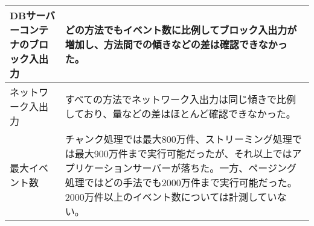 \documentclass[../../../main]{subfiles}
\begin{document}
\begin{table}[H]
\begin{tabular}{|p{4cm}|p{10cm}|}
            DBサーバーコンテナのブロック入出力       & どの方法でもイベント数に比例してブロック入出力が増加し、方法間での傾きなどの差は確認できなかった。                                                                                                                                                                                     \\ \hline
            ネットワーク入出力                & すべての方法でネットワーク入出力は同じ傾きで比例しており、量などの差はほとんど確認できなかった。                                                                                                                                                                                   \\ \hline
            最大イベント数                  & チャンク処理では最大800万件、ストリーミング処理では最大900万件まで実行可能だったが、それ以上ではアプリケーションサーバーが落ちた。一方、ページング処理ではどの手法でも2000万件まで実行可能だった。2000万件以上のイベント数については計測していない。                                                    \\ \hline
        \end{tabular}
    \end{table}
\end{document}
